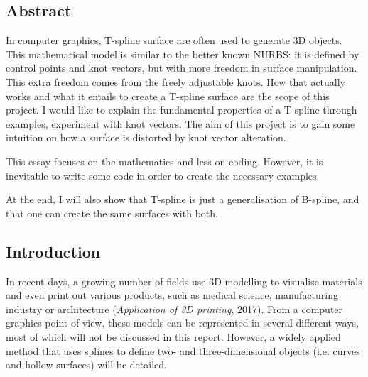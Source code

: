\documentclass{article}
\begin{document}
\newpage

\pagestyle{plain}
\setcounter{page}{1}

\renewcommand*\contentsname{Table of contents}
\tableofcontents






\newpage
{}
\pagestyle{plain}
\setcounter{page}{1}

\begin{large}
\section{Abstract}
\end{large}

\vspace{12pt}

In computer graphics, T-spline surface are often used to generate 3D objects. This mathematical model is similar to the better known NURBS: it is defined by control points and knot vectors, but with more freedom in surface manipulation. This extra freedom comes from the freely adjustable knots. How that actually works and what it entails to create a T-spline surface are the scope of this project. I would like to explain the fundamental properties of a T-spline through examples, experiment with knot vectors. The aim of this project is to gain some intuition on how a surface is distorted by knot vector alteration.

This essay focuses on the mathematics and less on coding. However, it is inevitable to write some code in order to create the necessary examples.

At the end, I will also show that T-spline is just a generalisation of B-spline, and that one can create the same surfaces with both.

\vspace{12pt}

\begin{large}
\section{Introduction}
\end{large}

\vspace{12pt}

In recent days, a growing number of fields use 3D modelling to visualise materials and even print out various products, such as medical science, manufacturing industry or architecture (\emph{Application of 3D printing}, 2017). 
From a computer graphics point of view, these models can be represented in several different ways, most of which will not be discussed in this report. However, a widely applied method that uses splines to define two- and three-dimensional objects (i.e. curves and hollow surfaces) will be detailed.
\end{document}
